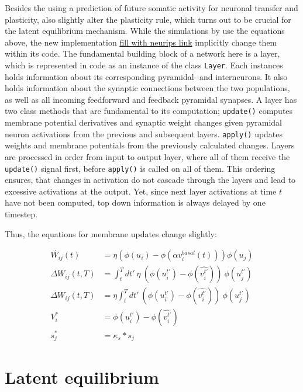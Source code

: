 Besides the using a prediction of future somatic activity for neuronal transfer and plasticity, \cite{Haider2021} also
slightly alter the plasticity rule, which turns out to be crucial for the latent equilibrium mechanism. While the
simulations by \cite{sacramento2018dendritic} use the equations above, the new implementation \href{https://github.com/neurips}{fill with neurips link}
implicitly change them within its code. The fundamental building block of a network here is a layer, which is
represented in code as an instance of the class \texttt{Layer}. Each instances holds information about its corresponding
pyramidal- and interneurons. It also holds information about the synaptic connections between the two populations, as
well as all incoming feedforward and feedback pyramidal synapses. A layer has two class methods that are fundamental
to its computation; \texttt{update()} computes membrane potential derivatives and synaptic weight changes given pyramidal
neuron activations from the previous and subsequent layers. \texttt{apply()} updates weights and membrane potentials
from the previously calculated changes. Layers are processed in order from input to output layer, where all of them
receive the \texttt{update()} signal first, before \texttt{apply()} is called on all of them. This ordering ensures,
that changes in activation do not cascade through the layers and lead to excessive activations at the output. Yet,
since next layer activations at time $t$ have not been computed, top down information is always delayed by one timestep.


Thus, the equations for membrane updates change slightly:

\begin{align}
  \dot{W_{ij}}(t)    & = \eta (\phi(u_i) - \phi(\alpha v^{basal}_i(t))) \phi(u_j)                             \\
  \Delta W_{ij}(t,T) & = \int_t^T dt' \ \eta \  (\phi(u_i^{t'}) - \phi(\widehat{v_i^{t'}})) \  \phi(u_j^{t'}) \\
  \Delta W_{ij}(t,T) & = \eta \int_t^T dt' \  (\phi(u_i^{t'}) - \phi(\widehat{v_i^{t'}})) \ \phi(u_j^{t'})    \\
  V_i^*              & = \phi(u_i^{t'}) - \phi(\widehat{v_i^{t'}})                                            \\
  s_j^*              & = \kappa_s * s_j
\end{align}



\section{Latent equilibrium}

